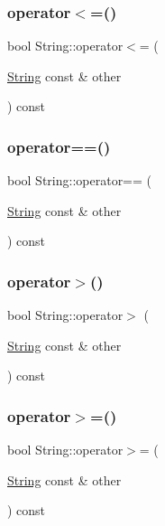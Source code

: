 \mbox{\label{classString_a2ee4e8d42626851256a5432bf838d5f9}} 
\subsubsection{\texorpdfstring{operator$<$=()}{operator<=()}}
{\footnotesize\ttfamily bool String\+::operator$<$= (\begin{DoxyParamCaption}\item[{\hyperlink{classString}{String} const \&}]{other }\end{DoxyParamCaption}) const}

\mbox{\label{classString_a2525ca0e0fd8e1a63d947f39ebc5e4d0}} 
\subsubsection{\texorpdfstring{operator==()}{operator==()}}
{\footnotesize\ttfamily bool String\+::operator== (\begin{DoxyParamCaption}\item[{\hyperlink{classString}{String} const \&}]{other }\end{DoxyParamCaption}) const}

\mbox{\label{classString_a4b9b4c9eab5759a848229a8209ac3ddf}} 
\subsubsection{\texorpdfstring{operator$>$()}{operator>()}}
{\footnotesize\ttfamily bool String\+::operator$>$ (\begin{DoxyParamCaption}\item[{\hyperlink{classString}{String} const \&}]{other }\end{DoxyParamCaption}) const}

\mbox{\label{classString_a21e5e59295a87f0af5b082c294c12f11}} 
\subsubsection{\texorpdfstring{operator$>$=()}{operator>=()}}
{\footnotesize\ttfamily bool String\+::operator$>$= (\begin{DoxyParamCaption}\item[{\hyperlink{classString}{String} const \&}]{other }\end{DoxyParamCaption}) const}

